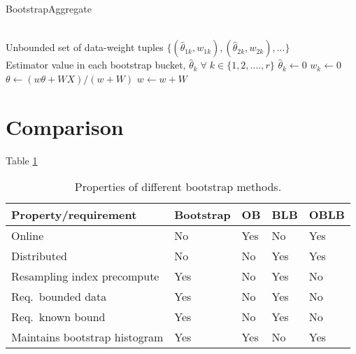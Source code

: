 \documentclass{article}
\begin{document}
\begin{algorithm}
\caption{BootstrapAggregate}
\label{onlinewmean}
\begin{algorithmic}[1]
\Require \\
Unbounded set of data-weight tuples $\{(\hat\theta_{1k}, w_{1k}), (\hat\theta_{2k}, w_{2k}), ...\}$
\Ensure \\
Estimator value in each bootstrap bucket, $\hat\theta_{k}\;\forall \; k\in \{1, 2, ...., r\}$
\State $\hat\theta_{k} \gets 0$
\State $w_{k} \gets 0$
\EndFor
{}
\State $\theta \gets (w\theta + WX)/(w + W)$
\State $w \gets w + W$ 
\EndFor
\EndProcedure
\end{algorithmic}
\end{algorithm}


\section{Comparison}

Table \ref{bootcomp}

\begin{table}[h]
\caption{Properties of different bootstrap methods.}
\label{bootcomp}
\begin{tabular}{lllll}
\hline
\hline
Property/requirement & Bootstrap & OB & BLB & OBLB \\
\hline
Online & No & Yes & No & Yes \\ 
Distributed & No & No & Yes &  Yes \\ 
Resampling index precompute & Yes & No & Yes & No \\ 
Req.\ bounded data & Yes & No & Yes & No \\ 
Req.\ known bound & Yes & No & Yes & No \\ 
Maintains bootstrap histogram & Yes & Yes & No & Yes \\
\hline
\hline
\end{tabular}
\end{table}




{}

\end{document}
